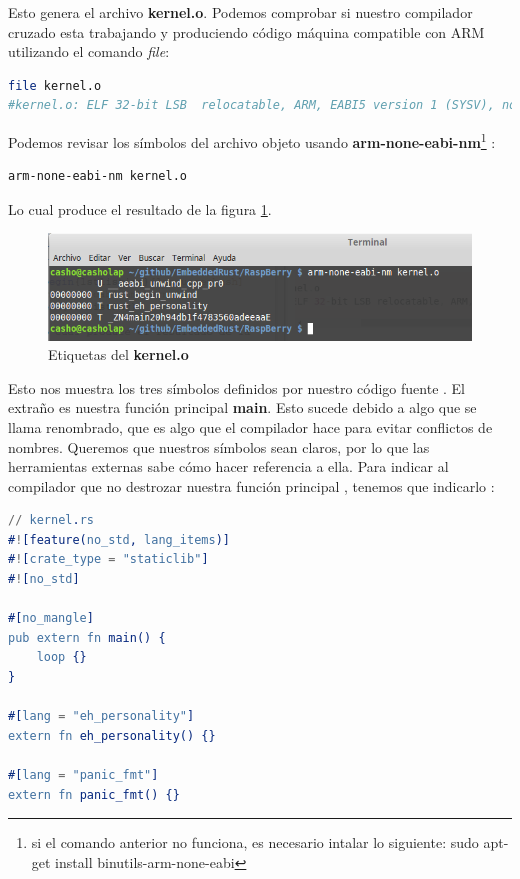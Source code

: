 \documentclass[12pt, twoside]{report}
\begin{document}
Esto genera el archivo \textbf{kernel.o}. Podemos comprobar si nuestro compilador cruzado esta trabajando y produciendo código máquina compatible con ARM utilizando el comando \emph{file}:

\begin{lstlisting}[language=bash]
file kernel.o
#kernel.o: ELF 32-bit LSB  relocatable, ARM, EABI5 version 1 (SYSV), not stripped
\end{lstlisting}

Podemos revisar los símbolos del archivo objeto usando \textbf{arm-none-eabi-nm}\footnote{si el comando anterior no funciona, es necesario intalar lo siguiente: sudo apt-get install binutils-arm-none-eabi} :

\begin{lstlisting}[language=bash]
arm-none-eabi-nm kernel.o
\end{lstlisting}

Lo cual produce el resultado de la figura \ref{fig0003}.

\begin{figure}
	\centering	\includegraphics[width=1\linewidth]{rust_kernel3.png}
	\caption{Etiquetas del \textbf{kernel.o}}
	\label{fig0003}
\end{figure}

Esto nos muestra los tres símbolos definidos por nuestro código fuente . El extraño es nuestra función principal \textbf{main}. Esto sucede debido a algo que se llama renombrado, que es algo que el compilador hace para evitar conflictos de nombres. Queremos que nuestros símbolos sean claros, por lo que las herramientas externas sabe cómo hacer referencia a ella. Para indicar al compilador que no destrozar nuestra función principal , tenemos que indicarlo :

\begin{lstlisting}[language=erlang]
// kernel.rs
#![feature(no_std, lang_items)]
#![crate_type = "staticlib"]
#![no_std]

#[no_mangle]
pub extern fn main() {  
    loop {}
}

#[lang = "eh_personality"]
extern fn eh_personality() {}

#[lang = "panic_fmt"]
extern fn panic_fmt() {}  
\end{lstlisting}
\end{document}
